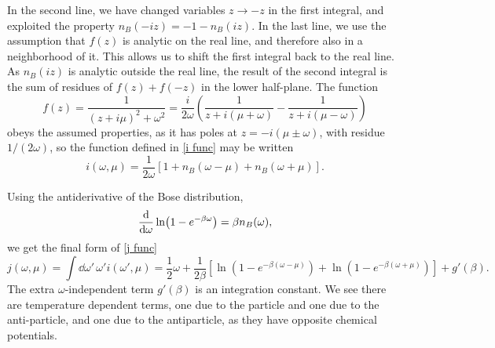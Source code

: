 In the second line, we have changed variables $z \rightarrow -z$ in the first integral, and exploited the property $n_B(-i z) = -1 - n_B(iz)$.
In the last line, we use the assumption that $f(z)$ is analytic on the real line, and therefore also in a neighborhood of it. 
This allows us to shift the first integral back to the real line.
As $n_B(iz)$ is analytic outside the real line, the result of the second integral is the sum of residues of $f(z) + f(-z)$ in the lower half-plane.
The function
\begin{equation}
    f(z) 
    = \frac{1}{(z + i \mu)^2 + \omega^2} 
    = \frac{i}{2 \omega } 
    \left(
        \frac{1}{z + i(\mu + \omega)} - \frac{1}{z + i(\mu - \omega)}
    \right)
\end{equation}
obeys the assumed properties, as it has poles at
$z = - i (\mu \pm \omega)$, with residue $1 /( 2 \omega)$, so the function defined in \autoref{i func} may be written
\begin{equation}
    i(\omega, \mu) 
    = \frac{1}{2\omega}
    [1 + n_B(\omega - \mu) + n_B(\omega + \mu)].
\end{equation}

Using the antiderivative of the Bose distribution,
\begin{equation}
    \dv{\omega} \ln(1 - e^{-\beta \omega}) = \beta n_B(\omega),
\end{equation}
we get the final form of \autoref{j func}
\begin{equation}
    j(\omega, \mu) = \int \dd \omega'\, \omega' i(\omega', \mu)
    =  
    \frac{1}{2}\omega + \frac{1}{2\beta} 
    \left[
        \ln\left(1 - e^{-\beta(\omega - \mu)}\right)
        + \ln\left(1 - e^{-\beta(\omega + \mu)}\right)
    \right]
    + g'(\beta).
\end{equation}
The extra $\omega$-independent term $g'(\beta)$ is an integration constant.
We see there are temperature dependent terms, one due to the particle and one due to the anti-particle, and one due to the antiparticle, as they have opposite chemical potentials.

